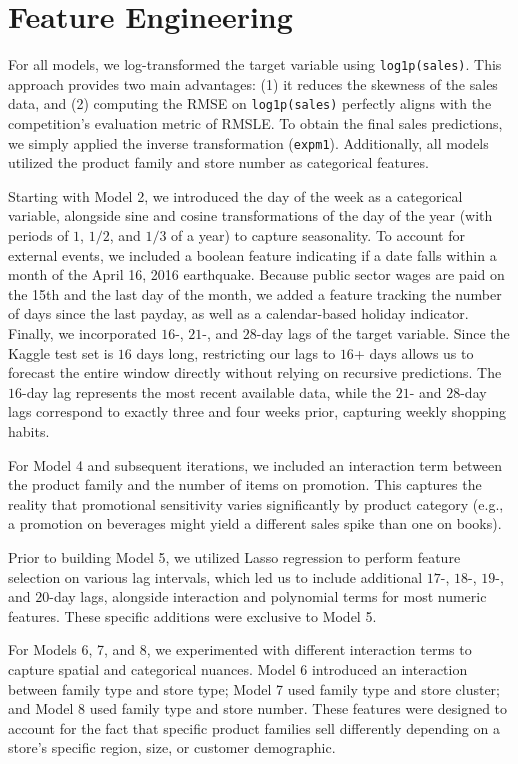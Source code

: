 \documentclass{article}
\begin{document}
\section{Feature Engineering}

For all models, we log-transformed the target variable using \texttt{log1p(sales)}. This approach provides two main advantages: (1) it reduces the skewness of the sales data, and (2) computing the RMSE on \texttt{log1p(sales)} perfectly aligns with the competition's evaluation metric of RMSLE. To obtain the final sales predictions, we simply applied the inverse transformation (\texttt{expm1}). Additionally, all models utilized the product family and store number as categorical features.

Starting with Model 2, we introduced the day of the week as a categorical variable, alongside sine and cosine transformations of the day of the year (with periods of $1$, $1/2$, and $1/3$ of a year) to capture seasonality. To account for external events, we included a boolean feature indicating if a date falls within a month of the April 16, 2016 earthquake. Because public sector wages are paid on the 15th and the last day of the month, we added a feature tracking the number of days since the last payday, as well as a calendar-based holiday indicator. Finally, we incorporated $16$-, $21$-, and $28$-day lags of the target variable. Since the Kaggle test set is $16$ days long, restricting our lags to $16$+ days allows us to forecast the entire window directly without relying on recursive predictions. The $16$-day lag represents the most recent available data, while the $21$- and $28$-day lags correspond to exactly three and four weeks prior, capturing weekly shopping habits.

For Model 4 and subsequent iterations, we included an interaction term between the product family and the number of items on promotion. This captures the reality that promotional sensitivity varies significantly by product category (e.g., a promotion on beverages might yield a different sales spike than one on books). 

Prior to building Model 5, we utilized Lasso regression to perform feature selection on various lag intervals, which led us to include additional $17$-, $18$-, $19$-, and $20$-day lags, alongside interaction and polynomial terms for most numeric features. These specific additions were exclusive to Model 5. 

For Models 6, 7, and 8, we experimented with different interaction terms to capture spatial and categorical nuances. Model 6 introduced an interaction between family type and store type; Model 7 used family type and store cluster; and Model 8 used family type and store number. These features were designed to account for the fact that specific product families sell differently depending on a store's specific region, size, or customer demographic.
\end{document}
